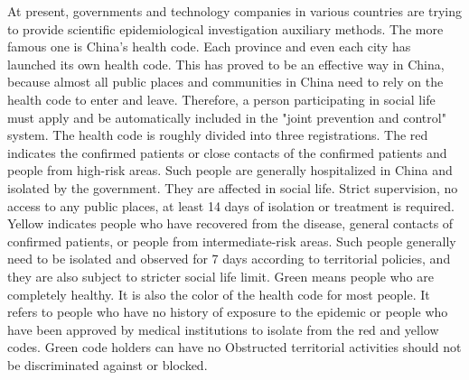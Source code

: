 \documentclass[conference]{IEEEtran}
\begin{document}
\par At present, governments and technology companies in various countries are trying to provide scientific epidemiological investigation auxiliary methods. The more famous one is China's health code. Each province and even each city has launched its own health code. This has proved to be an effective way in China, because almost all public places and communities in China need to rely on the health code to enter and leave. Therefore, a person participating in social life must apply and be automatically included in the "joint prevention and control" system. The health code is roughly divided into three registrations. The red indicates the confirmed patients or close contacts of the confirmed patients and people from high-risk areas. Such people are generally hospitalized in China and isolated by the government. They are affected in social life. Strict supervision, no access to any public places, at least 14 days of isolation or treatment is required. Yellow indicates people who have recovered from the disease, general contacts of confirmed patients, or people from intermediate-risk areas. Such people generally need to be isolated and observed for 7 days according to territorial policies, and they are also subject to stricter social life limit. Green means people who are completely healthy. It is also the color of the health code for most people. It refers to people who have no history of exposure to the epidemic or people who have been approved by medical institutions to isolate from the red and yellow codes. Green code holders can have no Obstructed territorial activities should not be discriminated against or blocked.
\end{document}
